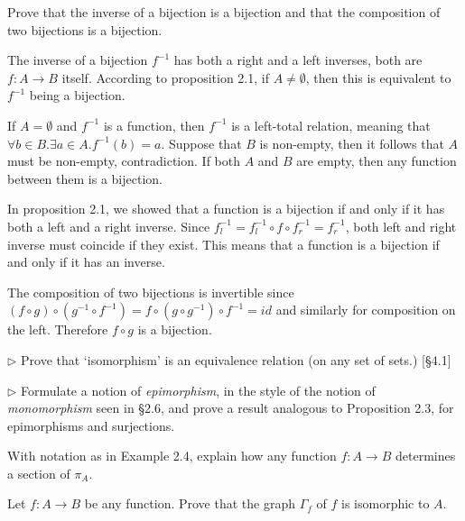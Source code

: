 \begin{problem}
  Prove that the inverse of a bijection is a bijection and that the
  composition of two bijections is a bijection.
\end{problem}
\begin{solution}
  The inverse of a bijection $f^{-1}$ has both a right and a left
  inverses, both are $f : A \to B$ itself. According to proposition 2.1,
  if $A\neq\emptyset$, then this is equivalent to $f^{-1}$ being a bijection.

  If $A=\emptyset$ and $f^{-1}$ is a function, then $f^{-1}$ is a left-total
  relation, meaning that $\forall b \in B. \exists a \in A. f^{-1}(b) = a$.
  Suppose that $B$ is non-empty, then it follows that $A$ must be non-empty,
  contradiction. If both $A$ and $B$ are empty, then any function between them
  is a bijection.

  In proposition 2.1, we showed that a function is a bijection if and only if
  it has both a left and a right inverse. Since $f_l^{-1} =
  f_l^{-1} \circ f \circ f_r^{-1} = f_r^{-1}$, both left and right inverse must
  coincide if they exist. This means that a function is a bijection if and only
  if it has an inverse.

  The composition of two bijections is invertible since $(f \circ g) \circ
  (g^{-1} \circ f^{-1}) = f \circ (g \circ g^{-1}) \circ f^{-1} = id$ and
  similarly for composition on the left. Therefore $f \circ g$ is a bijection.
\end{solution}

\begin{problem}
  $\rhd$ Prove that `isomorphism' is an equivalence relation (on any set
  of sets.) [\S4.1]
\end{problem}

\begin{problem}
  $\rhd$ Formulate a notion of \textit{epimorphism}, in the style
  of the notion of \textit{monomorphism} seen in \S 2.6, and prove a result
  analogous to Proposition 2.3, for epimorphisms and surjections.
\end{problem}

\begin{problem}
  With notation as in Example 2.4, explain how any function $f:A\to B$
  determines a section of $\pi_A$.
\end{problem}

\begin{problem}
  Let $f:A\to B$ be any function. Prove that the graph $\Gamma_f$ of $f$ is
  isomorphic to $A$.
\end{problem}

